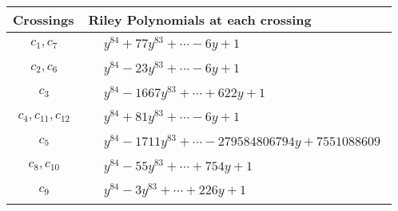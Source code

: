 \documentclass[1p]{elsarticle_modified}
\theoremstyle{definition}
\begin{document}
\begin{tabular}{m{50pt}|m{274pt}}
Crossings & \hspace{64pt}Riley Polynomials at each crossing \\
\hline $$\begin{aligned}c_{1},c_{7}\end{aligned}$$&$\begin{aligned}
&y^{84}+77 y^{83}+\cdots-6 y+1
\end{aligned}$\\
\hline $$\begin{aligned}c_{2},c_{6}\end{aligned}$$&$\begin{aligned}
&y^{84}-23 y^{83}+\cdots-6 y+1
\end{aligned}$\\
\hline $$\begin{aligned}c_{3}\end{aligned}$$&$\begin{aligned}
&y^{84}-1667 y^{83}+\cdots+622 y+1
\end{aligned}$\\
\hline $$\begin{aligned}c_{4},c_{11},c_{12}\end{aligned}$$&$\begin{aligned}
&y^{84}+81 y^{83}+\cdots-6 y+1
\end{aligned}$\\
\hline $$\begin{aligned}c_{5}\end{aligned}$$&$\begin{aligned}
&y^{84}-1711 y^{83}+\cdots-279584806794 y+7551088609
\end{aligned}$\\
\hline $$\begin{aligned}c_{8},c_{10}\end{aligned}$$&$\begin{aligned}
&y^{84}-55 y^{83}+\cdots+754 y+1
\end{aligned}$\\
\hline $$\begin{aligned}c_{9}\end{aligned}$$&$\begin{aligned}
&y^{84}-3 y^{83}+\cdots+226 y+1
\end{aligned}$\\
\hline
\end{tabular}
\vskip 2pc
\end{document}
